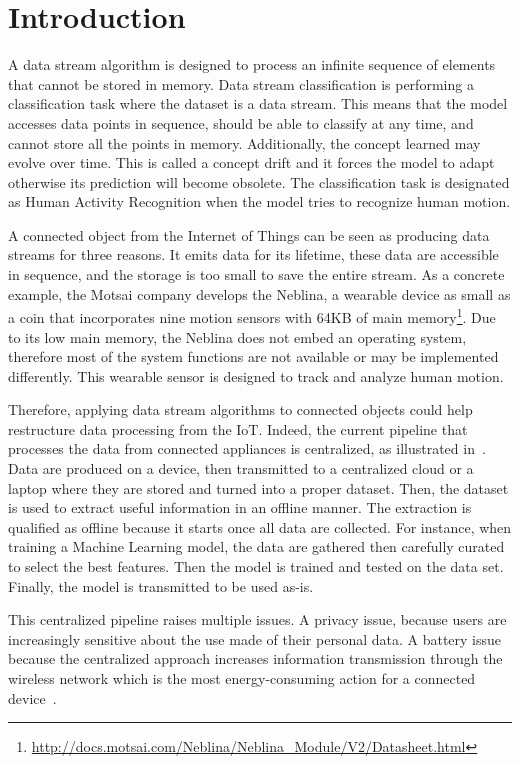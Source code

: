 \section{Introduction}
\label{sec:introduction}
A data stream algorithm is designed to process an infinite sequence of elements
that cannot be stored in memory. Data stream classification is
performing a classification task where the dataset is a data stream. This means
that the model accesses data points in sequence, should be able to classify at
any time, and cannot store all the points in memory. Additionally, the concept
learned may evolve over time. This is called a concept drift and it forces the
model to adapt otherwise its prediction will become obsolete.  The
classification task is designated as Human Activity Recognition when the model
tries to recognize human motion.

A connected object from the Internet of Things can
be seen as producing data streams for three
reasons. It emits data for its lifetime, these
data are accessible in sequence, and the storage
is too small to save the entire stream.  As a
concrete example, the Motsai company develops the
Neblina, a wearable device as small as a coin that
incorporates nine motion sensors with 64KB of main
memory\footnote{\url{http://docs.motsai.com/Neblina/Neblina_Module/V2/Datasheet.html}}.
Due to its low main memory, the Neblina does not
embed an operating system, therefore most of the
system functions are not available or may be
implemented differently.  This wearable sensor is
designed to track and analyze human motion.

Therefore, applying data stream algorithms to connected objects could help
restructure data processing from the IoT.  Indeed, the current pipeline that
processes the data from connected appliances is centralized, as illustrated
in~\cite{recofit}.  Data are produced on a device, then transmitted to a
centralized cloud or a laptop where they are stored and turned into a proper
dataset. Then, the dataset is used to extract useful information in an offline
manner.  The extraction is qualified as offline because it starts once all data
are collected. For instance, when training a Machine Learning model, the data
are gathered then carefully curated to select the best features. Then the model
is trained and tested on the data set. Finally, the model is transmitted to be
used as-is.

This centralized pipeline raises multiple issues.  A privacy issue, because
users are increasingly sensitive about the use made of their personal data.  A
battery issue because the centralized approach increases information
transmission through the wireless network which is the most energy-consuming
action for a connected device~\cite{sensor-network-survey,
sensor-energy-model}.

